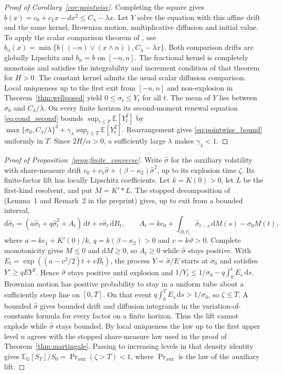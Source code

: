 \documentclass{rQUF2e}
\theoremstyle{plain}
\theoremstyle{definition}
\theoremstyle{remark}
\newcommand{\D}{\mathrm{d}}
\newcommand{\E}{\mathbb{E}}
\newcommand{\Q}{\mathbb{Q}}
\begin{document}
\begin{proof}[Proof of Corollary~\ref{cor:pointwise}] Completing the square gives $b(x)=c_0+c_1x-dx^2\le C_\lambda-\lambda x$. Let $Y$ solve the equation with this affine drift and the same kernel, Brownian motion, multiplicative diffusion and initial value. To apply the scalar comparison theorem of \citet[Theorem~3.3]{Alfonsi2025}, use $b_n(x)=\min\{b((-n)\vee(x\wedge n)),C_\lambda-\lambda x\}$. Both comparison drifts are globally Lipschitz and $b_n=b$ on $[-n,n]$. The fractional kernel is completely monotone and satisfies the integrability and increment condition of that theorem for $H>0$. The constant kernel admits the usual scalar diffusion comparison. Local uniqueness up to the first exit from $[-n,n]$ and non-explosion in Theorem~\ref{thm:wellposed} yield $0\le\sigma_t\le Y_t$ for all $t$. The mean of $Y$ lies between $\sigma_0$ and $C_\lambda/\lambda$. On every finite horizon its second-moment renewal equation \eqref{eq:cond_second} bounds $\sup_{t\le T}\E[Y_t^2]$ by $\max\{\sigma_0,C_\lambda/\lambda\}^2+\gamma_\lambda\sup_{t\le T}\E[Y_t^2]$. Rearrangement gives \eqref{eq:pointwise_bound} uniformly in $T$. Since $2H/\alpha>0$, a sufficiently large $\lambda$ makes $\gamma_\lambda<1$. \end{proof}

\begin{proof}[Proof of Proposition~\ref{prop:finite_converse}] Write $\widehat\sigma$ for the auxiliary volatility with share-measure drift $c_0+c_1\widehat\sigma+(\beta-\kappa_2)\widehat\sigma^2$, up to its explosion time $\zeta$. Its finite-factor lift has locally Lipschitz coefficients. Let $k=K(0)>0$, let $L$ be the first-kind resolvent, and put $M=K'*L$. The stopped decomposition of \citet{BondiPulido2026} (Lemma~1 and Remark~2 in the preprint) gives, up to exit from a bounded interval,
\[
\D\widehat\sigma_t=(a\widehat\sigma_t+q\widehat\sigma_t^2+A_t)\,\D t+v\widehat\sigma_t\,\D B_t,\qquad
A_t=kc_0+\int_{(0,t]}\widehat\sigma_{t-s}\,\D M(s)-\sigma_0M(t),
\]
where $a=kc_1+K'(0)/k$, $q=k(\beta-\kappa_2)>0$ and $v=k\vartheta>0$. Complete monotonicity gives $M\le0$ and $\D M\ge0$, so $A_t\ge0$ while $\widehat\sigma$ stays positive. With $E_t=\exp((a-v^2/2)t+vB_t)$, the process $Y=\widehat\sigma/E$ starts at $\sigma_0$ and satisfies $Y'\ge qE Y^2$. Hence $\widehat\sigma$ stays positive until explosion and $1/Y_t\le1/\sigma_0-q\int_0^tE_s\,\D s$. Brownian motion has positive probability to stay in a uniform tube about a sufficiently steep line on $[0,T]$. On that event $q\int_0^T E_s\,\D s>1/\sigma_0$, so $\zeta\le T$. A bounded $\widehat\sigma$ gives bounded drift and diffusion integrands in the variation-of-constants formula for every factor on a finite horizon. Thus the lift cannot explode while $\widehat\sigma$ stays bounded. By local uniqueness the law up to the first upper level $n$ agrees with the stopped share-measure law used in the proof of Theorem~\ref{thm:martingale}. Passing to increasing levels in that density identity gives $\E_\Q[S_T]/S_0=\Pr_{\mathrm{aux}}(\zeta>T)<1$, where $\Pr_{\mathrm{aux}}$ is the law of the auxiliary lift. \end{proof}
\end{document}
